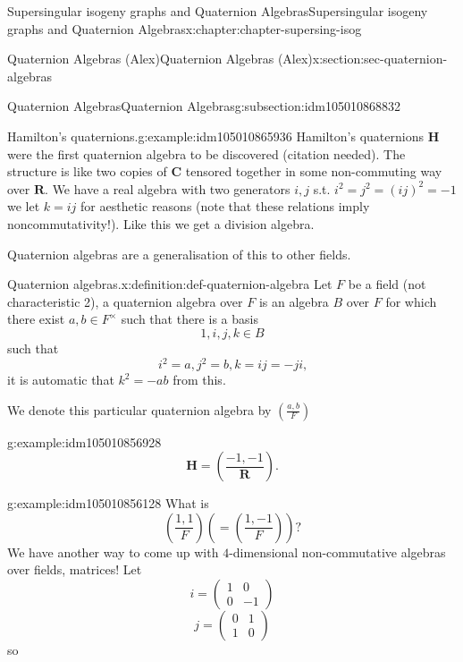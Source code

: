 \documentclass[oneside,10pt,]{book}
\numberwithin{equation}{section}
\newcommand{\legendre}[2]{\left(\frac{#1}{#2}\right)}
\newcommand{\RR}{\mathbf{R}}
\newcommand{\CC}{\mathbf{C}}
\newcommand{\HH}{\mathbf{H}}
\newcommand{\amp}{&}
\begin{document}
\begin{chapterptx}{Supersingular isogeny graphs and Quaternion Algebras}{}{Supersingular isogeny graphs and Quaternion Algebras}{}{}{x:chapter:chapter-supersing-isog}
\begin{sectionptx}{Quaternion Algebras (Alex)}{}{Quaternion Algebras (Alex)}{}{}{x:section:sec-quaternion-algebras}
\begin{subsectionptx}{Quaternion Algebras}{}{Quaternion Algebras}{}{}{g:subsection:idm105010868832}
\begin{introduction}{}
\begin{example}{Hamilton's quaternions.}{g:example:idm105010865936}
Hamilton's quaternions \(\HH\) were the first quaternion algebra to be discovered (citation needed). The structure is like two copies of \(\CC\) tensored together in some non-commuting way over \(\RR\). We have a real algebra with two generators \(i,j\) s.t. \(i^2 = j^2  = (ij)^2 = -1\) we let \(k = ij\) for aesthetic reasons (note that these relations imply noncommutativity!). Like this we get a division algebra.%
\end{example}
Quaternion algebras are a generalisation of this to other fields.%
\begin{definition}{Quaternion algebras.}{x:definition:def-quaternion-algebra}%
Let \(F\) be a field (not characteristic 2), a quaternion algebra over \(F\) is an algebra \(B\) over \(F\) for which there exist \(a,b\in F^\times\) such that there is a basis%
\begin{equation*}
1,i,j,k \in B
\end{equation*}
such that%
\begin{equation*}
i^2 = a,j^2=b,k=ij=-ji\text{,}
\end{equation*}
it is automatic that \(k^2 = -ab\) from this.%
\par
We denote this particular quaternion algebra by \(\legendre{a,b}{F}\)%
\end{definition}
\begin{example}{}{g:example:idm105010856928}%
%
\begin{equation*}
\HH = \legendre{-1,-1}{\RR}\text{.}
\end{equation*}
%
\end{example}
\begin{example}{}{g:example:idm105010856128}%
What is%
\begin{equation*}
\legendre{1,1}{F} \left( = \legendre{1,-1}{F}\right)\text{?}
\end{equation*}
We have another way to come up with \(4\)-dimensional non-commutative algebras over fields, matrices! Let%
\begin{equation*}
i=  \begin{pmatrix} 1\amp0\\0\amp -1\end{pmatrix}
\end{equation*}
%
\begin{equation*}
j =\begin{pmatrix} 0\amp1\\1\amp 0\end{pmatrix}
\end{equation*}
so%
\begin{equation*}

\end{equation*}
\end{example}
\end{introduction}
\end{subsectionptx}
\end{sectionptx}
\end{chapterptx}
\end{document}
